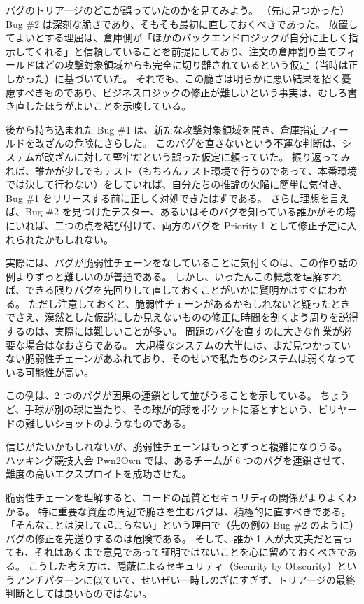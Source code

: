 \documentclass[uplatex]{jsarticle}
\def\label#1{}%
\begin{document}
バグのトリアージのどこが誤っていたのかを見てみよう。
（先に見つかった）Bug \#2 は深刻な脆さであり、そもそも最初に直しておくべきであった。
放置してよいとする理屈は、倉庫側が「ほかのバックエンドロジックが自分に正しく指示してくれる」と信頼していることを前提にしており、注文の倉庫割り当てフィールドはどの攻撃対象領域からも完全に切り離されているという仮定（当時は正しかった）に基づいていた。
それでも、この脆さは明らかに悪い結果を招く憂慮すべきものであり、ビジネスロジックの修正が難しいという事実は、むしろ書き直したほうがよいことを示唆している。

後から持ち込まれた Bug \#1 は、新たな攻撃対象領域を開き、倉庫指定フィールドを改ざんの危険にさらした。
このバグを直さないという不運な判断は、システムが改ざんに対して堅牢だという誤った仮定に頼っていた。
振り返ってみれば、誰かが少しでもテスト（もちろんテスト環境で行うのであって、本番環境では決して行わない）をしていれば、自分たちの推論の欠陥に簡単に気付き、Bug \#1 をリリースする前に正しく対処できたはずである。
さらに理想を言えば、Bug \#2 を見つけたテスター、あるいはそのバグを知っている誰かがその場にいれば、二つの点を結び付けて、両方のバグを Priority-1 として修正予定に入れられたかもしれない。

実際には、バグが脆弱性チェーンをなしていることに気付くのは、この作り話の例よりずっと難しいのが普通である。
しかし、いったんこの概念を理解すれば、できる限りバグを先回りして直しておくことがいかに賢明かはすぐにわかる。
ただし注意しておくと、脆弱性チェーンがあるかもしれないと疑ったときでさえ、漠然とした仮説にしか見えないものの修正に時間を割くよう周りを説得するのは、実際には難しいことが多い。
問題のバグを直すのに大きな作業が必要な場合はなおさらである。
大規模なシステムの大半には、まだ見つかっていない脆弱性チェーンがあふれており、そのせいで私たちのシステムは弱くなっている可能性が高い。

この例は、2 つのバグが因果の連鎖として並びうることを示している。
ちょうど、手球が別の球に当たり、その球が的球をポケットに落とすという、ビリヤードの難しいショットのようなものである。

\begin{exa}\label{exa:ch8-pwn2own}
信じがたいかもしれないが、脆弱性チェーンはもっとずっと複雑になりうる。
ハッキング競技大会 Pwn2Own では、あるチームが 6 つのバグを連鎖させて、難度の高いエクスプロイトを成功させた。
\end{exa}

脆弱性チェーンを理解すると、コードの品質とセキュリティの関係がよりよくわかる。
特に重要な資産の周辺で脆さを生むバグは、積極的に直すべきである。
「そんなことは決して起こらない」という理由で（先の例の Bug \#2 のように）バグの修正を先送りするのは危険である。
そして、誰か 1 人が大丈夫だと言っても、それはあくまで意見であって証明ではないことを心に留めておくべきである。
こうした考え方は、隠蔽によるセキュリティ（Security by Obscurity）というアンチパターンに似ていて、せいぜい一時しのぎにすぎず、トリアージの最終判断としては良いものではない。
\end{document}

